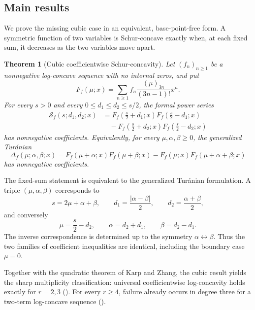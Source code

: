 \documentclass[11pt,a4paper]{amsart}
\numberwithin{equation}{section}
\theoremstyle{plain}
\newtheorem{theorem}{Theorem}[section]
\theoremstyle{definition}
\newcommand{\Tur}{\Delta}
\begin{document}
\subsection{Main results}\label{subsec:intro-main}

We prove the missing cubic case in an equivalent, base-point-free form.  A
symmetric function of two variables is Schur-concave
\cite[Def.~3.A.1]{MarshallOlkinArnold2011Majorization} exactly when, at each fixed
sum, it decreases as the two variables move apart.

\begin{theorem}[Cubic coefficientwise Schur-concavity]\label{thm:main}
Let \((f_n)_{n\ge1}\) be a nonnegative log-concave sequence with no internal
zeros, and put
\begin{equation}\label{eq:F-def}
 F_f(\mu;x)=\sum_{n\ge1}f_n\frac{(\mu)_{3n}}{(3n-1)!}x^n.
\end{equation}
For every \(s>0\) and every \(0\le d_1\le d_2\le s/2\), the formal power series
\begin{equation}\label{eq:schur-def}
 \begin{split}
 \mathcal S_f(s;d_1,d_2;x)
 &=F_f\left(\tfrac s2+d_1;x\right)F_f\left(\tfrac s2-d_1;x\right)\\
 &\quad-F_f\left(\tfrac s2+d_2;x\right)F_f\left(\tfrac s2-d_2;x\right)
 \end{split}
\end{equation}
has nonnegative coefficients.  Equivalently, for every \(\mu,\alpha,\beta\ge0\),
the generalized Tur\'anian
\begin{equation}\label{eq:Turan-def}
 \Tur_f(\mu;\alpha,\beta;x)
 =F_f(\mu+\alpha;x)F_f(\mu+\beta;x)
 -F_f(\mu;x)F_f(\mu+\alpha+\beta;x)
\end{equation}
has nonnegative coefficients.
\end{theorem}

The fixed-sum statement is equivalent to the generalized Tur\'anian formulation.  A
triple \((\mu,\alpha,\beta)\) corresponds to
\[
 s=2\mu+\alpha+\beta,\qquad
 d_1=\frac{|\alpha-\beta|}{2},\qquad
 d_2=\frac{\alpha+\beta}{2},
\]
and conversely
\[
 \mu=\frac s2-d_2,\qquad
 \alpha=d_2+d_1,\qquad
 \beta=d_2-d_1.
\]
The inverse correspondence is determined up to the symmetry
\(\alpha\leftrightarrow\beta\).  Thus the two families of coefficient inequalities
are identical, including the boundary case \(\mu=0\).

Together with the quadratic theorem of Karp and Zhang, the cubic result yields the
sharp multiplicity classification: universal coefficientwise log-concavity holds
exactly for \(r=2,3\) ().  For every \(r\ge4\), failure already
occurs in degree three for a two-term log-concave sequence
().
\end{document}
